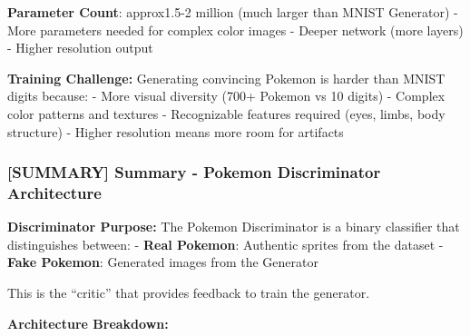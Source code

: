 \documentclass[11pt]{article}
\begin{document}
\textbf{Parameter Count}: approx1.5-2 million (much larger than MNIST
Generator) - More parameters needed for complex color images - Deeper
network (more layers) - Higher resolution output

\textbf{Training Challenge:} Generating convincing Pokemon is harder
than MNIST digits because: - More visual diversity (700+ Pokemon vs 10
digits) - Complex color patterns and textures - Recognizable features
required (eyes, limbs, body structure) - Higher resolution means more
room for artifacts

    \subsubsection{{[}SUMMARY{]} Summary - Pokemon Discriminator
Architecture}\label{summary-summary---pokemon-discriminator-architecture}

\textbf{Discriminator Purpose:} The Pokemon Discriminator is a binary
classifier that distinguishes between: - \textbf{Real Pokemon}:
Authentic sprites from the dataset - \textbf{Fake Pokemon}: Generated
images from the Generator

This is the ``critic'' that provides feedback to train the generator.

\textbf{Architecture Breakdown:}
\end{document}
